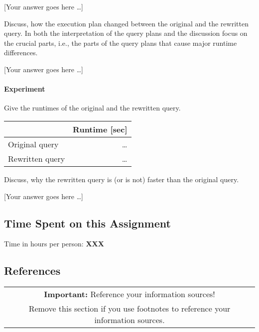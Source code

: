 \documentclass[11pt]{scrartcl}
\newcommand{\youranswerhere}{[Your answer goes here \ldots]}
\begin{document}
    \youranswerhere{}

    Discuss, how the execution plan changed between the original and the rewritten query. In both the interpretation of the query plans and the discussion focus on the crucial parts, i.e., the parts of the query plans that cause major runtime differences.

    \youranswerhere{}

    \paragraph{Experiment}

    Give the runtimes of the original and the rewritten query.

    \begin{table}[H]
        \centering
        \begin{tabular}{l|r}
            & Runtime [sec] \tabularnewline
            \hline
            Original query  & \ldots \tabularnewline
            Rewritten query & \ldots \tabularnewline
        \end{tabular}
    \end{table}

    Discuss, why the rewritten query is (or is not) faster than the original query.

    \youranswerhere{}

    \subsection*{Time Spent on this Assignment}

    Time in hours per person: \textbf{XXX}

    \subsection*{References}

    \begin{table}[H]
        \centering
        \begin{tabular}{c}
            \hline
            \textbf{Important:} Reference your information sources! \tabularnewline
            Remove this section if you use footnotes to reference your information sources. \tabularnewline
            \hline
        \end{tabular}
    \end{table}
\end{document}
